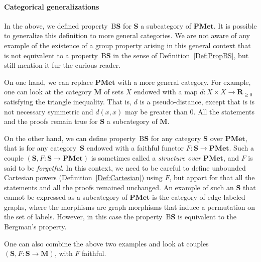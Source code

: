 \documentclass[a4paper]{article}
\theoremstyle{definition}
\newcommand*{\field}[1]{\mathbf{#1}}
\newcommand*{\category}[1]{\textbf{#1}}
\newcommand*{\PMet}{\category{PMet}}
\newcommand*{\CatS}{\category{S}}
\newcommand*{\R}{\field{R}}
\newcommand*{\BS}{B\textbf{S}}
\begin{document}
\paragraph{Categorical generalizations}
In the above, we defined property~\BS{} for \CatS{} a subcategory of $\PMet$.
It is possible to generalize this definition to more general categories.
We are not aware of any example of the existence of a group property arising in this general context that is not equivalent to a property~\BS{} in the sense of Definition~\ref{Def:PropBS}, but still mention it fur the curious reader.

On one hand, we can replace $\PMet$ with a more general category.
For example, one can look at the category $\category{M}$ of sets $X$ endowed with a map $d\colon X\times X\to\R_{\geq 0}$ satisfying the triangle inequality.
That is, $d$ is a pseudo-distance, except that is is not necessary symmetric and $d(x,x)$ may be greater than $0$.
All the statements and the proofs remain true for \CatS{} a subcategory of $\category{M}$.

On the other hand, we can define property~\BS{} for any category \CatS{} over $\PMet$, that is for any category~\CatS{} endowed with a faithful functor $F\colon\CatS\to \PMet$.
Such a couple $(\CatS,F\colon\CatS\to \PMet)$ is sometimes called a \emph{structure over $\PMet$}, and $F$ is said to be \emph{forgetful}.
In this context, we need to be careful to define unbounded Cartesian powers (Definition~\ref{Def:Cartesian}) using $F$, but appart for that all the statements and all the proofs remained unchanged.
An example of such an \CatS{} that cannot be expressed as a subcategory of $\PMet$ is the category of edge-labeled graphs, where the morphisms are graph morphisms that induce a permutation on the set of labels.
However, in this case the property~\BS{} is equivalent to the Bergman's property.

One can also combine the above two examples and look at couples $(\CatS,F\colon\CatS\to \category{M})$, with $F$ faithful.
\end{document}
